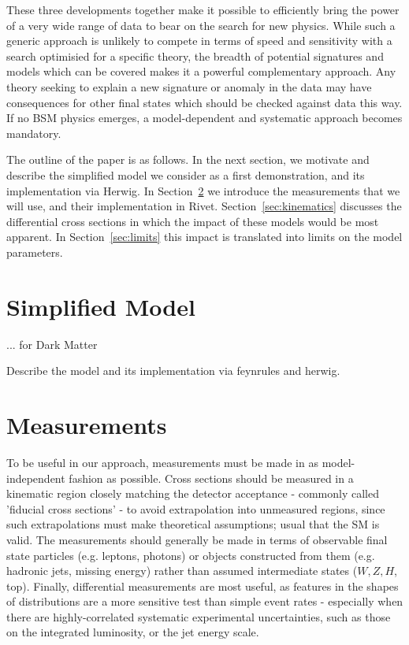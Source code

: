 \documentclass[floatfix]{article}
\begin{document}
These three developments together make it possible to efficiently 
bring the power of a very wide range of data to bear on the search for new physics. While such a generic approach is
unlikely to compete in terms of speed and sensitivity with a search optimisied for a specific theory, the breadth
of potential signatures and models which can be covered makes it a powerful complementary approach. Any theory seeking
to explain a new signature or anomaly in the data may have consequences for other final states which should be checked 
against data this way. If no BSM physics emerges, a model-dependent and systematic approach becomes mandatory.

The outline of the paper is as follows. In the next section, we motivate and describe the 
simplified model we consider as a first demonstration, and its implementation via Herwig. 
In Section~\ref{sec:measurements} we introduce the measurements that we will use, and their implementation in Rivet. 
Section~\ref{sec:kinematics} discusses the differential cross sections in which the impact of these models would be 
most apparent. In Section~\ref{sec:limits} this impact is translated into limits on the model parameters.

\section{Simplified Model}\label{sec:models}

... for Dark Matter

Describe the model and its implementation via feynrules and herwig.

\cite{Kahlhoefer:2015bea}

\section{Measurements}\label{sec:measurements}

To be useful in our approach, measurements must be made in as model-independent fashion as possible. 
Cross sections should be measured in a kinematic region closely matching the detector acceptance - commonly called 
'fiducial cross sections' - to avoid extrapolation into unmeasured regions, since such extrapolations must make 
theoretical assumptions; usual that the SM is valid. The measurements should generally be made in terms of observable final
state particles (e.g. leptons, photons) or objects constructed from them (e.g. hadronic jets, missing energy) 
rather than assumed intermediate states ($W, Z, H$, top). Finally, differential measurements are most useful, as features
in the shapes of distributions are a more sensitive test than simple event rates - especially when there are
highly-correlated systematic experimental uncertainties, such as those on the integrated luminosity, or the jet energy scale.
\end{document}
